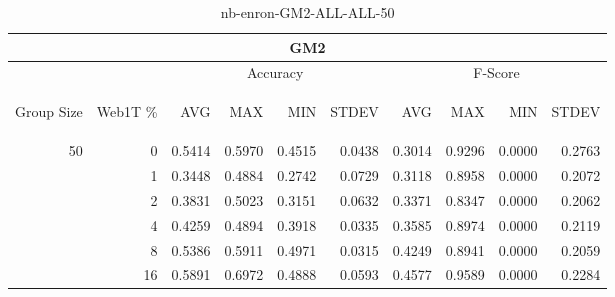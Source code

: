 \begin{center}
\begin{table}[htbp]
\begin{tabular}{ | r | r | r | r | r | r | r | r | r | r |}
\hline
\multicolumn{10}{|c|}{GM2}\\
\hline
 & & \multicolumn{4}{|c|}{Accuracy} & \multicolumn{4}{|c|}{F-Score}\\ \cline{3-10}
\begin{sideways}Group Size\end{sideways} & \begin{sideways}Web1T \%\end{sideways} & \begin{sideways}AVG\end{sideways} & \begin{sideways}MAX\end{sideways} & \begin{sideways}MIN\end{sideways} & \begin{sideways}STDEV\end{sideways} & \begin{sideways}AVG\end{sideways} & \begin{sideways}MAX\end{sideways} & \begin{sideways}MIN\end{sideways} & \begin{sideways}STDEV\end{sideways}\\
\hline
\multirow{5}{*}{50}
 & 0 & 0.5414 & 0.5970 & 0.4515 & 0.0438 & 0.3014 & 0.9296 & 0.0000 & 0.2763\\ \cline{2-10}
 & 1 & 0.3448 & 0.4884 & 0.2742 & 0.0729 & 0.3118 & 0.8958 & 0.0000 & 0.2072\\ \cline{2-10}
 & 2 & 0.3831 & 0.5023 & 0.3151 & 0.0632 & 0.3371 & 0.8347 & 0.0000 & 0.2062\\ \cline{2-10}
 & 4 & 0.4259 & 0.4894 & 0.3918 & 0.0335 & 0.3585 & 0.8974 & 0.0000 & 0.2119\\ \cline{2-10}
 & 8 & 0.5386 & 0.5911 & 0.4971 & 0.0315 & 0.4249 & 0.8941 & 0.0000 & 0.2059\\ \cline{2-10}
 & 16 & 0.5891 & 0.6972 & 0.4888 & 0.0593 & 0.4577 & 0.9589 & 0.0000 & 0.2284\\ \cline{2-10}
\hline
\end{tabular}
\caption{nb-enron-GM2-ALL-ALL-50}
\label{table:nb-enron-GM2-ALL-ALL-50}
\end{table}
\end{center}


